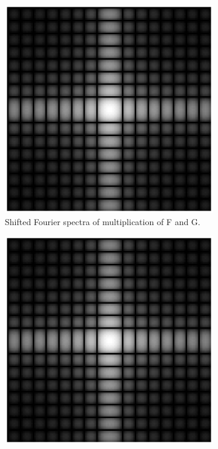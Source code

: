 \documentclass[11pt,a4paper]{article}
\begin{document}
\begin{itemize}
\begin{figure}[!ht]
\begin{subfigure}[t]{.32\linewidth}
		\includegraphics[width=0.95\columnwidth]{Multiplication_Shifted_Fourier_F_G.eps}
		\caption{\scriptsize Shifted Fourier spectra of multiplication of F and G.}
		\label{fig:shiftedFourierF*G}
		\end{subfigure}
		\begin{subfigure}[t]{.32\linewidth} %
		\includegraphics[width=0.95\columnwidth]{Multiplication_Shifted_Fourier_Convolution_F_G.eps}

\end{subfigure}
\end{figure}
\end{itemize}
\end{document}
